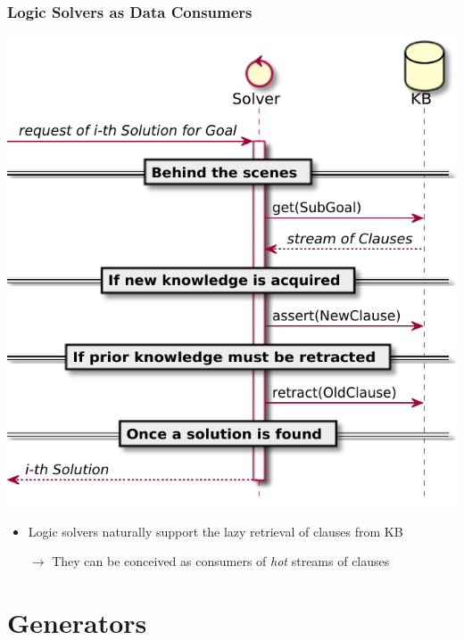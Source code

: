 \documentclass[presentation]{beamer}
\begin{document}
\begin{frame}%
    \frametitle{Logic Solvers as Data \textbf{Consumers}}
    
    \begin{center}
        \includegraphics[width=.4\linewidth]{img/streamful-kb.pdf}
    \end{center}
    \begin{itemize}
        \item Logic solvers naturally support the \alert{lazy} retrieval of clauses from KB
        \item[$\rightarrow$] They can be conceived as \alert{consumers} of \emph{hot} streams of clauses
    \end{itemize}
    
\end{frame}

\section{Generators}
\end{document}

